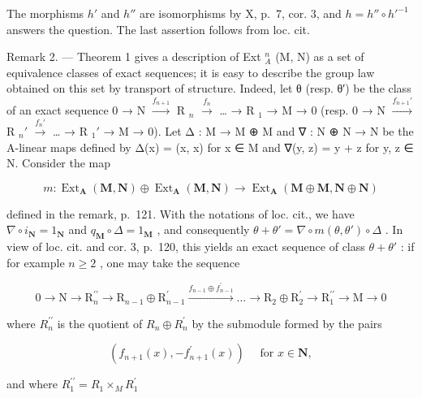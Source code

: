 The morphisms \(h'\) and \(h''\) are isomorphisms by X, p.~7, cor. 3, and \(h = h'' \circ h'^{-1}\) answers the question. The last assertion follows from loc. cit.

Remark 2. --- Theorem 1 gives a description of Ext \(_{A}^{n}\) (M, N) as a set of equivalence classes of exact sequences; it is easy to describe the group law obtained on this set by transport of structure. Indeed, let θ (resp. θ′) be the class of an exact sequence 0 → N \(\xrightarrow{f_{n+1}}\) R \(_{n}\) \(\xrightarrow{f_n}\) \ldots{} → R \(_{1}\) → M → 0 (resp. 0 → N \(\xrightarrow{f_{n+1}'}\) R \(_{n}'\) \(\xrightarrow{f_n'}\) \ldots{} → R \(_{1}'\) → M → 0). Let Δ : M → M ⊕ M and ∇ : N ⊕ N → N be the A-linear maps defined by Δ(x) = (x, x) for x ∈ M and ∇(y, z) = y + z for y, z ∈ N. Consider the map

\[
m: \operatorname{Ext} _ {\mathbf {A}} (\mathbf {M}, \mathbf {N}) \oplus \operatorname{Ext} _ {\mathbf {A}} (\mathbf {M}, \mathbf {N}) \rightarrow \operatorname{Ext} _ {\mathbf {A}} (\mathbf {M} \oplus \mathbf {M}, \mathbf {N} \oplus \mathbf {N})
\]

defined in the remark, p.~121. With the notations of loc. cit., we have \(\nabla \circ i_{\mathbf{N}} = 1_{\mathbf{N}}\) and \(q_{\mathbf{M}} \circ \Delta = 1_{\mathbf{M}}\) , and consequently \(\theta + \theta' = \nabla \circ m(\theta, \theta') \circ \Delta\) . In view of loc. cit. and cor. 3, p.~120, this yields an exact sequence of class \(\theta + \theta'\) : if for example \(n \geqslant 2\) , one may take the sequence

\[
0 \rightarrow \mathrm{N} \rightarrow \mathrm{R} _ {n} ^ {\prime \prime} \rightarrow \mathrm{R} _ {n - 1} \oplus \mathrm{R} _ {n - 1} ^ {\prime} \xrightarrow {f _ {n - 1} \oplus f _ {n - 1} ^ {\prime}} \dots \rightarrow \mathrm{R} _ {2} \oplus \mathrm{R} _ {2} ^ {\prime} \rightarrow \mathrm{R} _ {1} ^ {\prime \prime} \rightarrow \mathrm{M} \rightarrow 0
\]

where \(R_{n}^{\prime\prime}\) is the quotient of \(R_{n} \oplus R_{n}^{\prime}\) by the submodule formed by the pairs

\[
\left(f _ {n + 1} (x), - f _ {n + 1} ^ {\prime} (x)\right) \quad \text { for } x \in \mathbf {N},
\]

and where \(R_{1}^{\prime\prime}=R_{1}\times_{M}R_{1}^{\prime}\)
\relax{}

